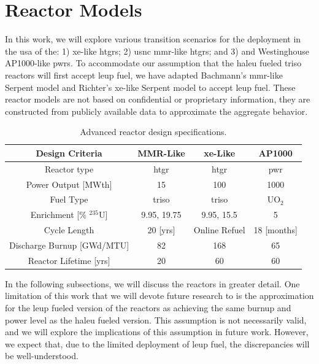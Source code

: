 \section{Reactor Models}
\label{sec:reactor_models}

In this work, we will explore various transition scenarios for the deployment in the \gls{usa} of the: 1) \gls{xe}-like \glspl{htgr}; 2) \gls{usnc} \gls{mmr}-like \glspl{htgr}; and 3) and Westinghouse AP1000-like \glspl{pwr}. To accommodate our assumption that the \gls{haleu} fueled \gls{triso} reactors will first accept \gls{leup} fuel, we have adapted Bachmann's \gls{mmr}-like Serpent model \cite{bachmann_mmr_like_2023} and Richter's \gls{xe}-like Serpent model \cite{richter_xe100_like} to accept \gls{leup} fuel. These reactor models are not based on confidential or proprietary information, they are constructed from publicly available data to approximate the aggregate behavior.

\begin{table}[H]
   \centering
   \caption{Advanced reactor design specifications.}
   \label{tab:ar_defs}
   \begin{tabular}{c c c c}
      \hline
      \textbf{Design Criteria} & \textbf{MMR-Like} \cite{usnc_design_2021} & \textbf{\gls{xe}-Like} \cite{nuscale_chapter_2018} & \textbf{AP1000} \\
      \hline
      Reactor type & \gls{htgr} & \gls{htgr} & \gls{pwr} \\
      Power Output [MWth] & 15 & 100 & 1000 \\
      Fuel Type & \gls{triso} & \gls{triso} & UO$_2$ \\
      Enrichment [\% $^{235}$U] & 9.95, 19.75 & 9.95, 15.5 & 5 \\
      Cycle Length & 20 [yrs] & Online Refuel & 18 [months] \\
      Discharge Burnup [GWd/MTU] & 82 & 168 & 65 \\
      Reactor Lifetime [yrs] & 20 & 60 & 60 \\
      \hline
   \end{tabular}
\end{table}

In the following subsections, we will discuss the reactors in greater detail. One limitation of this work that we will devote future research to is the approximation for the \gls{leup} fueled version of the reactors as achieving the same burnup and power level as the \gls{haleu} fueled version. This assumption is not necessarily valid, and we will explore the implications of this assumption in future work. However, we expect that, due to the limited deployment of \gls{leup} fuel, the discrepancies will be well-understood.

